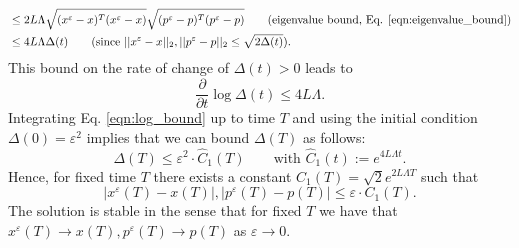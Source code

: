 \documentclass[11pt]{article}
\begin{document}
\begin{equation}
\begin{aligned}
                                             & \le 2L\Lambda \sqrt{(x^\varepsilon-x)^T(x^\varepsilon-x)}
        \sqrt{(p^\varepsilon-p)^T(p^\varepsilon-p)}                                                                                                           \qquad\text{(eigenvalue bound, Eq. \eqref{eqn:eigenvalue_bound})} \\
                                             & \le 4L\Lambda \Delta(t)\qquad\text{(since $||x^\varepsilon-x||_2, ||p^\varepsilon-p||_2\le \sqrt{2\Delta(t)}$)}.
    \end{aligned}
\end{equation}
This bound on the rate of change of $\Delta(t)> 0$ leads to
\begin{equation}
    \frac{\partial}{\partial t}\log \Delta(t) \le 4L\Lambda.\label{eqn:log_bound}
\end{equation}
Integrating Eq. \eqref{eqn:log_bound} up to time $T$ and using the initial condition $\Delta(0)=\varepsilon^2$ implies that we can bound $\Delta(T)$ as follows:
\begin{equation}
    \Delta(T) \le \varepsilon^2\cdot \widehat{C}_1(T) \qquad \text{with $\widehat{C}_1(t) := e^{4L\Lambda t}$}.
\end{equation}
Hence, for fixed time $T$ there exists a constant $C_1(T)=\sqrt{2}e^{2L\Lambda T}$ such that
\begin{equation}
    |x^\varepsilon(T)-x(T)|,|p^\varepsilon(T)-p(T)| \le \varepsilon \cdot C_1(T).
\end{equation}
The solution is stable in the sense that for fixed $T$ we have that $x^\varepsilon(T)\rightarrow x(T),p^\varepsilon(T)\rightarrow p(T)$ as $\varepsilon\rightarrow 0$.
\end{document}
